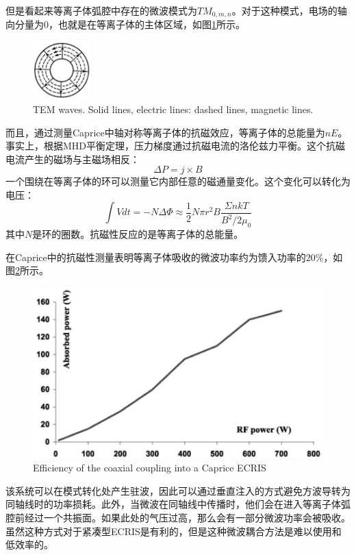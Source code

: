 \documentclass[fontset=windows]{article}
\begin{document}
但是看起来等离子体弧腔中存在的微波模式为$TM_{0,m,n}$。对于这种模式，电场的轴向分量为0，也就是在等离子体的主体区域，如图\ref{TEM}所示。
\begin{figure}
    \centering
    \includegraphics[width=0.2\textwidth]{TEM.png}
    \caption{TEM waves. Solid lines, electric lines: dashed lines, magnetic lines.}
    \label{TEM}
\end{figure}

而且，通过测量Caprice中轴对称等离子体的抗磁效应，等离子体的总能量为$nE$。事实上，根据MHD平衡定理，压力梯度通过抗磁电流的洛伦兹力平衡。这个抗磁电流产生的磁场与主磁场相反：
\begin{equation}
    \Delta P=j\times B
\end{equation}
一个围绕在等离子体的环可以测量它内部任意的磁通量变化。这个变化可以转化为电压：
\begin{equation}
    \int V dt=-N\Delta \Phi\approx\frac{1}{2}N\pi r^2B\frac{\Sigma nkT}{B^2/2\mu_0}
\end{equation}
其中$N$是环的圈数。抗磁性反应的是等离子体的总能量。

在Caprice中的抗磁性测量表明等离子体吸收的微波功率约为馈入功率的20$\%$，如图\ref{Efficiency-1}所示。
\begin{figure}
    \centering
    \includegraphics{Efficiency of the.png}
    \caption{Efficiency of the coaxial coupling into a Caprice ECRIS}
    \label{Efficiency-1}
\end{figure}

该系统可以在模式转化处产生驻波，因此可以通过垂直注入的方式避免方波导转为同轴线时的功率损耗。此外，当微波在同轴线中传播时，他们会在进入等离子体弧腔前经过一个共振面。如果此处的气压过高，那么会有一部分微波功率会被吸收。虽然这种方式对于紧凑型ECRIS是有利的，但是这种微波耦合方法是难以使用和低效率的。
\end{document}
